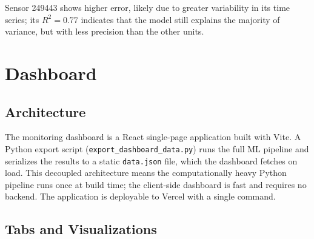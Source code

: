 \documentclass[11pt, letterpaper]{article}
\begin{document}
Sensor 249443 shows higher error, likely due to greater variability in its
time series; its $R^2 = 0.77$ indicates that the model still explains the
majority of variance, but with less precision than the other units.

\section{Dashboard}

\subsection{Architecture}

The monitoring dashboard is a React single-page application built with Vite.
A Python export script (\texttt{export\_dashboard\_data.py}) runs the full ML
pipeline and serializes the results to a static \texttt{data.json} file, which
the dashboard fetches on load.
This decoupled architecture means the computationally heavy Python pipeline
runs once at build time; the client-side dashboard is fast and requires no backend.
The application is deployable to Vercel with a single command.

\subsection{Tabs and Visualizations}
\end{document}
